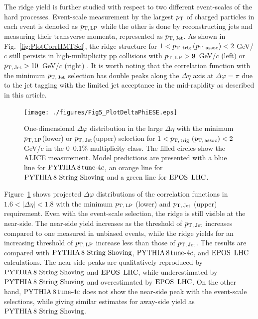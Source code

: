 The ridge yield is further studied with respect to two different event-scales of the hard processes. Event-scale measurement by the largest $p_\mathrm{T}$ of charged particles in each event is denoted as $p_\mathrm{T,\,LP}$ while the other is done by reconstructing jets and measuring their transverse momenta, represented as $p_\mathrm{T,\,Jet}$. As shown in Fig.~\ref{fig:PlotCorrHMTSel}, the ridge structure for $1< p_\mathrm{T,\,trig}\,(p_\mathrm{T,\,assoc}) <2$ GeV/$c$ still persists in high-multiplicity pp collisions with $p_\mathrm{T,\,LP}>9$~GeV/$c$ (left) or $p_\mathrm{T,\,Jet}>10$~GeV/$c$ (right) .  %
It is worth noting that the correlation function with the minimum $p_\mathrm{T,\,Jet}$ selection has double peaks along the $\Delta\eta$ axis at $\Delta\varphi = \pi$ due to the jet tagging with the limited jet acceptance in the mid-rapidity as described in this article.

\begin{figure}[h!]
	\centering
	\texttt{[image: ./figures/Fig5\_PlotDeltaPhiESE.eps]}
	\caption{ One-dimensional $\Delta\varphi$ distribution in the large $\Delta\eta$ with the minimum $p_\mathrm{T,\,LP}$(lower) or $p_\mathrm{T,\,Jet}$(upper) selection for $1< p_\mathrm{T,\,trig}~\mathrm (p_\mathrm{T,\,assoc}) <2$ GeV/$c$ in the 0--0.1\% multiplicity class. The filled circles show the ALICE measurement. Model predictions are presented with a blue line for $\mathrm{PYTHIA}\,8\,\mathrm{tune}{\text -}4c$, an orange line for ${\mathrm{PYTHIA}\,8~\mathrm{String}~}\mathrm{Shoving}$ and a green line for ${\mathrm{EPOS}\,~\mathrm{LHC}}$.}
	\label{fig:PlotDeltaPhiESE}
\end{figure}

Figure~\ref{fig:PlotDeltaPhiESE} shows projected $\Delta\varphi$ distributions of the correlation functions in $1.6<|\Delta\eta|<1.8$ with the minimum $p_\mathrm{T,\,LP}$ (lower) and $p_\mathrm{T,\,Jet}$ (upper) requirement. Even with the event-scale selection, the ridge is still visible at the near-side. The near-side yield increases as the threshold of $p_\mathrm{T,\,Jet}$ increases compared to one measured in unbiased events, while the ridge yields for an increasing threshold of $p_\mathrm{T,\,LP}$ increase less than those of $p_\mathrm{T,\,Jet}$. The results are compared with ${\mathrm{PYTHIA}\,8~\mathrm{String}~}\mathrm{Shoving}$, $\mathrm{PYTHIA}\,8\,\mathrm{tune}{\text -}4c$, and ${\mathrm{EPOS}\,~\mathrm{LHC}}$ calculations. The near-side peaks are qualitatively reproduced by ${\mathrm{PYTHIA}\,8~\mathrm{String}~}\mathrm{Shoving}$ and ${\mathrm{EPOS}\,~\mathrm{LHC}}$, while underestimated by ${\mathrm{PYTHIA}\,8~\mathrm{String}~}\mathrm{Shoving}$ and overestimated by ${\mathrm{EPOS}\,~\mathrm{LHC}}$. On the other hand, $\mathrm{PYTHIA}\,8\,\mathrm{tune}{\text -}4c$ does not show the near-side peak with the event-scale selections, while giving similar estimates for away-side yield as ${\mathrm{PYTHIA}\,8~\mathrm{String}~}\mathrm{Shoving}$.

